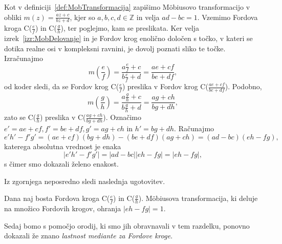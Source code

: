 \documentclass[mat1]{fmfdelo}
\begin{document}
\begin{dokaz}
Kot v definiciji~\ref{def:MobTransformacija} zapišimo M\"{o}biusovo transformacijo v obliki $m(z) = \frac{az+c}{bz+d}$, kjer so $a,b,c,d \in \mathbb{Z}$ in velja $ad-bc=1$. 
Vzemimo Fordova kroga C($\frac{e}{f}$) in C($\frac{g}{h}$), ter poglejmo, kam se preslikata. 
Ker velja izrek~\ref{izr:MobDelovanje} in je Fordov krog enolično določen s točko, v kateri se dotika realne osi v kompleksni ravnini, je dovolj poznati sliko te točke.
Izračunajmo
\[ m \left(\frac{e}{f} \right) = \frac{a \frac{e}{f} + c}{b \frac{e}{f} + d} = \frac{ae + cf}{be + df}, \]
od koder sledi, da se Fordov krog C($\frac{e}{f}$) preslika v Fordov krog C($\frac{ae+cf}{be+df}$).
Podobno,
\[ m \left(\frac{g}{h} \right) = \frac{a \frac{g}{h} + c}{b \frac{g}{h} + d} = \frac{ag + ch}{bg + dh}, \]
zato se C($\frac{g}{h}$) preslika v C($\frac{ag+ch}{bg+dh}$).
Označimo \( e' = ae+cf, f' = be+df, g' = ag+ch \) in $h' = bg+dh$. Računajmo
\[ e'h'-f'g' = (ae+cf)(bg+dh) - (be+df)(ag+ch) = (ad - bc)(eh - fg), \]
katerega absolutna vrednost je enaka
\[ |e'h'-f'g'| = |ad-bc| |eh-fg| = |eh-fg|, \]
s čimer smo dokazali želeno enakost.
\end{dokaz}

Iz zgornjega neposredno sledi naslednja ugotovitev.

\begin{posledica}
\label{Posl:MobOhr1}
Dana naj bosta Fordova kroga C($\frac{e}{f}$) in C($\frac{g}{h}$). M\"{o}biusova transformacija, ki deluje na množico Fordovih krogov, ohranja $|eh-fg|=1$.
\end{posledica}

Sedaj bomo s pomočjo orodij, ki smo jih obravnavali v tem razdelku, ponovno dokazali že znano \emph{lastnost mediante za Fordove kroge}.
\end{document}
